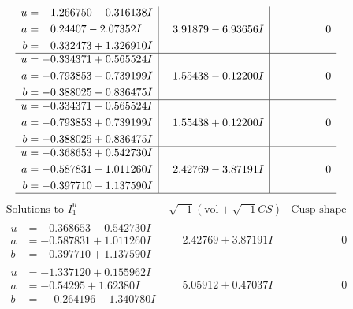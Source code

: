 \documentclass[1p]{elsarticle_modified}
\theoremstyle{definition}
\newcommand{\I}{\sqrt{-1}}
\begin{document}
$$\begin{array}{c|c|c}
\begin{aligned}
u &= \phantom{-}1.266750 - 0.316138 I \\
a &= \phantom{-}0.24407 - 2.07352 I \\
b &= \phantom{-}0.332473 + 1.326910 I\end{aligned}
 & \phantom{-}3.91879 - 6.93656 I & \phantom{-0.000000 } 0 \\ \hline\begin{aligned}
u &= -0.334371 + 0.565524 I \\
a &= -0.793853 - 0.739199 I \\
b &= -0.388025 - 0.836475 I\end{aligned}
 & \phantom{-}1.55438 - 0.12200 I & \phantom{-0.000000 } 0 \\ \hline\begin{aligned}
u &= -0.334371 - 0.565524 I \\
a &= -0.793853 + 0.739199 I \\
b &= -0.388025 + 0.836475 I\end{aligned}
 & \phantom{-}1.55438 + 0.12200 I & \phantom{-0.000000 } 0 \\ \hline\begin{aligned}
u &= -0.368653 + 0.542730 I \\
a &= -0.587831 - 1.011260 I \\
b &= -0.397710 - 1.137590 I\end{aligned}
 & \phantom{-}2.42769 - 3.87191 I & \phantom{-0.000000 } 0\\
 \hline 
 \end{array}$$\newpage$$\begin{array}{c|c|c}  
\text{Solutions to }I^u_{1}& \I (\text{vol} + \sqrt{-1}CS) & \text{Cusp shape}\\
 \hline 
\begin{aligned}
u &= -0.368653 - 0.542730 I \\
a &= -0.587831 + 1.011260 I \\
b &= -0.397710 + 1.137590 I\end{aligned}
 & \phantom{-}2.42769 + 3.87191 I & \phantom{-0.000000 } 0 \\ \hline\begin{aligned}
u &= -1.337120 + 0.155962 I \\
a &= -0.54295 + 1.62380 I \\
b &= \phantom{-}0.264196 - 1.340780 I\end{aligned}
 & \phantom{-}5.05912 + 0.47037 I & \phantom{-0.000000 } 0 \\ \hline\begin{aligned}

\end{aligned}
\end{array}$$
\end{document}
